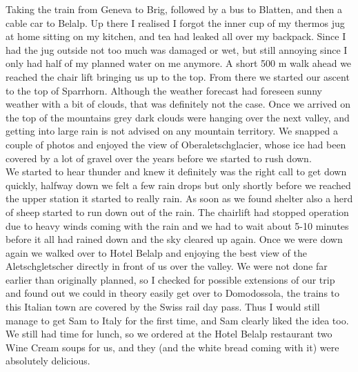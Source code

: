 Taking the train from Geneva to Brig, followed by a bus to Blatten, and then a cable car to Belalp. Up there I realised I forgot the inner cup of my thermos jug at home sitting on my kitchen, and tea had leaked all over my backpack. Since I had the jug outside not too much was damaged or wet, but still annoying since I only had half of my planned water on me anymore. A short 500 m walk ahead we reached the chair lift bringing us up to the top. From there we started our ascent to the top of Sparrhorn. Although the weather forecast had foreseen sunny weather with a bit of clouds, that was definitely not the case. Once we arrived on the top of the mountains grey dark clouds were hanging over the next valley, and getting into large rain is not advised on any mountain territory. We snapped a couple of photos and enjoyed the view of Oberaletschglacier, whose ice had been covered by a lot of gravel over the years before we started to rush down.\\
We started to hear thunder and knew it definitely was the right call to get down quickly, halfway down we felt a few rain drops but only shortly before we reached the upper station it started to really rain. As soon as we found shelter also a herd of sheep started to run down out of the rain. The chairlift had stopped operation due to heavy winds coming with the rain and we had to wait about 5-10 minutes before it all had rained down and the sky cleared up again. Once we were down again we walked over to Hotel Belalp and enjoying the best view of the Aletschgletscher directly in front of us over the valley. We were not done far earlier than originally planned, so I checked for possible extensions of our trip and found out we could in theory easily get over to Domodossola, the trains to this Italian town are covered by the Swiss rail day pass. Thus I would still manage to get Sam to Italy for the first time, and Sam clearly liked the idea too. We still had time for lunch, so we ordered at the Hotel Belalp restaurant two Wine Cream soups for us, and they (and the white bread coming with it) were absolutely delicious.\\
